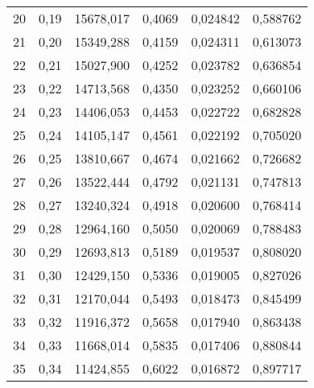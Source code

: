 \begin{exemple}
\begin{center}
\begin{tabular}{S[table-format=2.0]S[table-format=1.2]
    	                S[table-format=5.3]S[table-format=1.4]
    	            	S[table-format=1.6]S[table-format=1.6]}
    	20  &  0,19  &  15678,017  &  0,4069  &  0,024842  &  0,588762 \\
    	21  &  0,20  &  15349,288  &  0,4159  &  0,024311  &  0,613073 \\
    	22  &  0,21  &  15027,900  &  0,4252  &  0,023782  &  0,636854 \\
    	23  &  0,22  &  14713,568  &  0,4350  &  0,023252  &  0,660106 \\
    	24  &  0,23  &  14406,053  &  0,4453  &  0,022722  &  0,682828 \\
    	25  &  0,24  &  14105,147  &  0,4561  &  0,022192  &  0,705020 \\
    	26  &  0,25  &  13810,667  &  0,4674  &  0,021662  &  0,726682 \\
    	27  &  0,26  &  13522,444  &  0,4792  &  0,021131  &  0,747813 \\
    	28  &  0,27  &  13240,324  &  0,4918  &  0,020600  &  0,768414 \\
    	29  &  0,28  &  12964,160  &  0,5050  &  0,020069  &  0,788483 \\
    	30  &  0,29  &  12693,813  &  0,5189  &  0,019537  &  0,808020 \\
    	31  &  0,30  &  12429,150  &  0,5336  &  0,019005  &  0,827026 \\
    	32  &  0,31  &  12170,044  &  0,5493  &  0,018473  &  0,845499 \\
    	33  &  0,32  &  11916,372  &  0,5658  &  0,017940  &  0,863438 \\
    	34  &  0,33  &  11668,014  &  0,5835  &  0,017406  &  0,880844 \\
    	35  &  0,34  &  11424,855  &  0,6022  &  0,016872  &  0,897717 \\
    	\midrule
    	\end{tabular}
	\end{center}
    	

\end{exemple}
